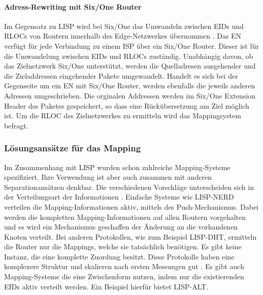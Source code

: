 \paragraph{Adress-Rewriting mit Six/One Router}
Im Gegensatz zu LISP wird bei Six/One das Umwandeln zwischen EIDs und RLOCs von Routern innerhalb des Edge-Netzwerkes übernommen \cite{vogt:2008:six}. Das EN verfügt für jede Verbindung zu einem ISP über ein Six/One Router. Dieser ist für die Umwandelung zwischen EIDs und RLOCs zuständig. Unabhängig davon, ob das Zielnetzwerk Six/One unterstützt, werden die Quelladresen ausgehender und die Zieladdressen eingehender Pakete umgewandelt. Handelt es sich bei der Gegenseite um ein EN mit Six/One Router, werden ebenfalls die jeweils anderen Adressen umgeschrieben. Die orginalen Addressen werden im Six/One Extension Header des Paketes gespeichert, so dass eine Rückübersetzung am Ziel möglich ist. Um die RLOC des Zielnetzwerkes zu ermitteln wird das Mappingsystem befragt.

\subsubsection{Lösungsansätze für das Mapping}
Im Zusammenhang mit LISP wurden schon zahlreiche Mapping-Systeme spezifiziert. Ihre Verwendung ist aber auch zusammen mit anderen Separationansätzen denkbar. Die verschiedenen Vorschläge unterscheiden sich in der Verteilungsart der Informationen \cite{mathy:2008:dht}. Einfache Systeme wie LISP-NERD verteilen die Mapping-Informationen aktiv, mittels des Push-Mechanismus. Dabei werden die kompletten Mapping-Informationen auf allen Routern vorgehalten und es wird ein Mechanismus geschaffen der Änderung an die vorhandenen Knoten verteilt. Bei anderen Protokollen, wie zum Beispiel LISP-DHT, ermitteln die Router nur die Mappings, welche sie tatsächlich benötigen. Es gibt keine Instanz, die eine komplette Zuordung besitzt. Diese Protokolle haben eine komplexere Struktur und skalieren nach ersten Messungen gut \cite{iannone:2007:cost}. Es gibt auch Mapping-Systeme die eine Zwischenform nutzen, indem nur die existierenden EIDs aktiv verteilt werden. Ein Beispiel hierfür bietet LISP-ALT.

